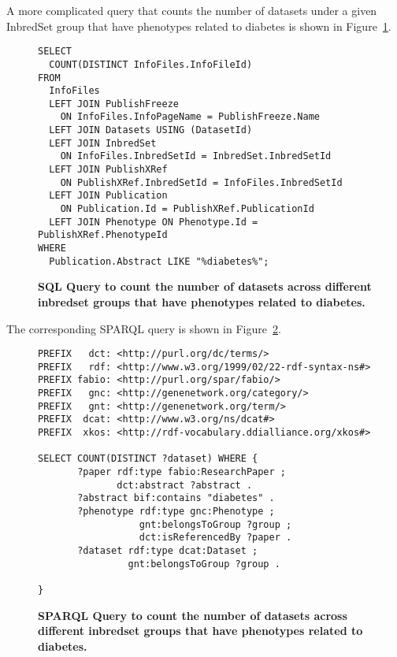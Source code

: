 A more complicated query that counts the number of datasets under a given InbredSet group that have phenotypes related to diabetes is shown in Figure~\ref{sql:datasets-phenotypes-diabetes}.

\begin{figure}[H]
\centering
\begin{verbatim}
SELECT 
  COUNT(DISTINCT InfoFiles.InfoFileId) 
FROM 
  InfoFiles 
  LEFT JOIN PublishFreeze
    ON InfoFiles.InfoPageName = PublishFreeze.Name 
  LEFT JOIN Datasets USING (DatasetId)
  LEFT JOIN InbredSet
    ON InfoFiles.InbredSetId = InbredSet.InbredSetId 
  LEFT JOIN PublishXRef
    ON PublishXRef.InbredSetId = InfoFiles.InbredSetId 
  LEFT JOIN Publication
    ON Publication.Id = PublishXRef.PublicationId 
  LEFT JOIN Phenotype ON Phenotype.Id = PublishXRef.PhenotypeId 
WHERE 
  Publication.Abstract LIKE "%diabetes%";
\end{verbatim}
\caption[SQL query to count diabetes-related phenotype datasets across different inbredset groups]{\textbf{SQL Query to count the number of datasets across different inbredset groups that have phenotypes related to diabetes.}}\label{sql:datasets-phenotypes-diabetes}
\end{figure}

The corresponding SPARQL query is shown in Figure~\ref{sparql:datasets-phenotypes-diabetes}.

\begin{figure}[H]
\centering
\begin{verbatim}
PREFIX   dct: <http://purl.org/dc/terms/>
PREFIX   rdf: <http://www.w3.org/1999/02/22-rdf-syntax-ns#>
PREFIX fabio: <http://purl.org/spar/fabio/>
PREFIX   gnc: <http://genenetwork.org/category/>
PREFIX   gnt: <http://genenetwork.org/term/>
PREFIX  dcat: <http://www.w3.org/ns/dcat#>
PREFIX  xkos: <http://rdf-vocabulary.ddialliance.org/xkos#>

SELECT COUNT(DISTINCT ?dataset) WHERE {
       ?paper rdf:type fabio:ResearchPaper ;
              dct:abstract ?abstract .
       ?abstract bif:contains "diabetes" .
       ?phenotype rdf:type gnc:Phenotype ;
                  gnt:belongsToGroup ?group ;
                  dct:isReferencedBy ?paper .
       ?dataset rdf:type dcat:Dataset ;
                gnt:belongsToGroup ?group .
                  
}
\end{verbatim}
\caption[SPARQL query to count diabetes-related phenotype datasets across different inbredset group]{\textbf{SPARQL Query to count the number of datasets across different inbredset groups that have phenotypes related to diabetes.}}\label{sparql:datasets-phenotypes-diabetes}
\end{figure}

